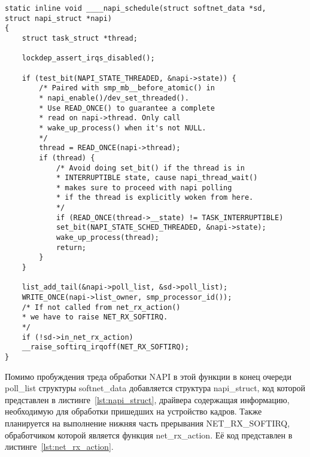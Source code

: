 \begin{center}
	\captionsetup{justification=raggedright,singlelinecheck=off}
	\begin{lstlisting}[label=lst:napi_schedule,caption=Функция \_\_\_\_napi\_schedule,showstringspaces=false]
static inline void ____napi_schedule(struct softnet_data *sd,
struct napi_struct *napi)
{
	struct task_struct *thread;
	
	lockdep_assert_irqs_disabled();
	
	if (test_bit(NAPI_STATE_THREADED, &napi->state)) {
		/* Paired with smp_mb__before_atomic() in
		* napi_enable()/dev_set_threaded().
		* Use READ_ONCE() to guarantee a complete
		* read on napi->thread. Only call
		* wake_up_process() when it's not NULL.
		*/
		thread = READ_ONCE(napi->thread);
		if (thread) {
			/* Avoid doing set_bit() if the thread is in
			* INTERRUPTIBLE state, cause napi_thread_wait()
			* makes sure to proceed with napi polling
			* if the thread is explicitly woken from here.
			*/
			if (READ_ONCE(thread->__state) != TASK_INTERRUPTIBLE)
			set_bit(NAPI_STATE_SCHED_THREADED, &napi->state);
			wake_up_process(thread);
			return;
		}
	}
	
	list_add_tail(&napi->poll_list, &sd->poll_list);
	WRITE_ONCE(napi->list_owner, smp_processor_id());
	/* If not called from net_rx_action()
	* we have to raise NET_RX_SOFTIRQ.
	*/
	if (!sd->in_net_rx_action)
	__raise_softirq_irqoff(NET_RX_SOFTIRQ);
}

	\end{lstlisting}
\end{center}
\FloatBarrier

Помимо пробуждения треда обработки NAPI в этой функции в конец очереди poll\_list структуры  softnet\_data добавляется структура  napi\_struct, код которой представлен в листинге~\ref{lst:napi_struct}, драйвера содержащая информацию, необходимую для обработки пришедших на устройство кадров. Также планируется на выполнение нижняя часть прерывания NET\_RX\_SOFTIRQ, обработчиком  которой является функция net\_rx\_action. Её код представлен в листинге~\ref{lst:net_rx_action}.

